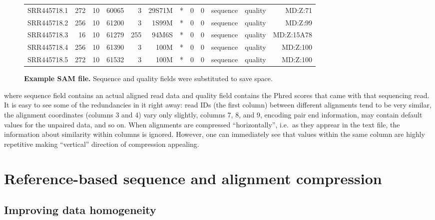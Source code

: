 \documentclass[12pt]{cmuthesis}
\begin{document}
  \begin{figure}[h!]
  \footnotesize
  \begin{tabular}{l r r r r r r r r r r r}
    \midrule
    SRR445718.1 & 272 & 10 & 60065 & 3 & 29S71M & * & 0 & 0 & sequence & quality & MD:Z:71 \\
    SRR445718.2 & 256 & 10 & 61200 & 3 & 1S99M & * & 0 & 0 & sequence &   quality & MD:Z:99 \\
    SRR445718.3 & 16 & 10 & 61279 & 255 & 94M6S & * & 0 & 0 & sequence & quality & MD:Z:15A78 \\
    SRR445718.4 & 256 & 10 & 61390 & 3 & 100M & * & 0 & 0 & sequence & quality & MD:Z:100 \\
    SRR445718.5 & 272 & 10 & 61532 & 3 & 100M & * & 0 & 0 & sequence & quality & MD:Z:100 \\
    \bottomrule
  \end{tabular}
  \caption{\textbf{Example SAM file.} Sequence and quality fields were substituted to save space.}
  \end{figure}
  \normalsize
  \noindent
  where sequence field contains an actual aligned read data and quality field contains the Phred scores that came with that sequencing read. It is easy to see some of the redundancies in it right away: read IDs (the first column) between different alignments tend to be very similar, the alignment coordinates (columns 3 and 4) vary only slightly, columns 7, 8, and 9, encoding pair end information, may contain default values for the unpaired data, and so on. When alignments are compressed ``horizontally'', i.e.\@~as they apprear in the text file, the information about similarity within columns is ignored. However, one can immediately see that values within the same column are highly repetitive making ``vertical'' direction of compression appealing.

\section{Reference-based sequence and alignment compression}

  \subsection{Improving data homogeneity}
\end{document}
